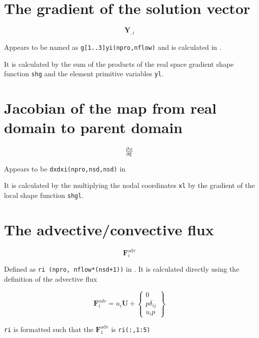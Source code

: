 \documentclass[12pt, letterpaper, twoside]{article}
\renewcommand{\vec}[1]{\bm{#1}}
\newcommand{\ttt}[1]{\texttt{#1}}
\newcommand{\U}{\vec{U}}
\newcommand{\Y}{\vec{Y}}
\newcommand{\F}{\vec{F}}
\newcommand{\0}{\vec{0}}
\begin{document}
\section{The gradient of the solution vector}

    \begin{equation}
        \Y_{,i}
    \end{equation}

    Appears to be named as \ttt{g[1..3]yi(npro,nflow)} and is calculated in .

    It is calculated by the sum of the products of the real space gradient shape function \ttt{shg} and the element primitive variables \ttt{yl}.

\section{Jacobian of the map from real domain to parent domain}

    \begin{equation}
        \pd{x}{\xi}
    \end{equation}

    Appears to be \ttt{dxdxi(npro,nsd,nsd)} in  

    It is calculated by the multiplying the nodal coordinates \ttt{xl} by the gradient of the local shape function \ttt{shgl}.

\section{The advective/convective flux}

    \begin{equation}
        \F_i^{\text{adv}}
    \end{equation}

    Defined as \ttt{ri (npro, nflow*(nsd+1))} in . It is calculated directly using the definition of the advective flux

    \begin{equation}
        \F_i^{adv}  = 
        u_i \U
        + \begin{Bmatrix}
            0 \\
            p \delta_{ij}\\
            u_i p
        \end{Bmatrix} 
    \end{equation}

    \ttt{ri} is formatted such that the \(\F_1^{\text{adv}}\) is \ttt{ri(:,1:5)}
\end{document}
